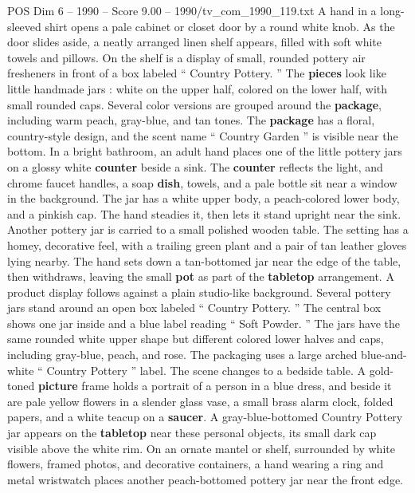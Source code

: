 \begin{textsample}{POS Dim 6 – 1990 – Score 9.00 – 1990/tv\_com\_1990\_119.txt}  \label{ex:f6_pos_073}
A hand in a long-sleeved shirt opens a pale cabinet or closet door by a round white knob.
As the door slides aside, a neatly arranged linen shelf appears, filled with soft white towels and pillows.
On the shelf is a display of small, rounded pottery air fresheners in front of a box labeled “ Country Pottery. ” The \textbf{pieces} look like little handmade jars : white on the upper half, colored on the lower half, with small rounded caps.
Several color versions are grouped around the \textbf{package}, including warm peach, gray-blue, and tan tones.
The \textbf{package} has a floral, country-style design, and the scent name “ Country Garden ” is visible near the bottom.
In a bright bathroom, an adult hand places one of the little pottery jars on a glossy white \textbf{counter} beside a sink.
The \textbf{counter} reflects the light, and chrome faucet handles, a soap \textbf{dish}, towels, and a pale bottle sit near a window in the background.
The jar has a white upper body, a peach-colored lower body, and a pinkish cap.
The hand steadies it, then lets it stand upright near the sink.
Another pottery jar is carried to a small polished wooden table.
The setting has a homey, decorative feel, with a trailing green plant and a pair of tan leather gloves lying nearby.
The hand sets down a tan-bottomed jar near the edge of the table, then withdraws, leaving the small \textbf{pot} as part of the \textbf{tabletop} arrangement.
A product display follows against a plain studio-like background.
Several pottery jars stand around an open box labeled “ Country Pottery. ” The central box shows one jar inside and a blue label reading “ Soft Powder. ” The jars have the same rounded white upper shape but different colored lower halves and caps, including gray-blue, peach, and rose.
The packaging uses a large arched blue-and-white “ Country Pottery ” label.
The scene changes to a bedside table.
A gold-toned \textbf{picture} frame holds a portrait of a person in a blue dress, and beside it are pale yellow flowers in a slender glass vase, a small brass alarm clock, folded papers, and a white teacup on a \textbf{saucer}.
A gray-blue-bottomed Country Pottery jar appears on the \textbf{tabletop} near these personal objects, its small dark cap visible above the white rim.
On an ornate mantel or shelf, surrounded by white flowers, framed photos, and decorative containers, a hand wearing a ring and metal wristwatch places another peach-bottomed pottery jar near the front edge.

\end{textsample}

